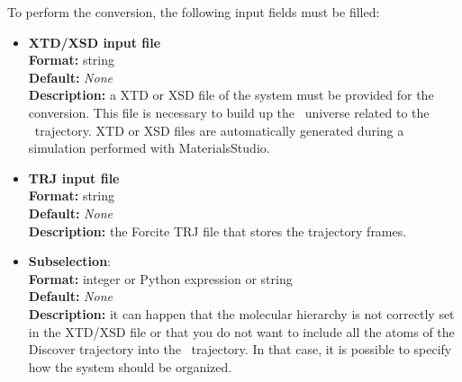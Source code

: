 \documentclass[a4paper,11pt]{report}
\begin{document}
To perform the conversion, the following input fields must be filled:
\hypertarget{forcite_converter_xtd_xsd_input_file}{}
\begin{itemize}
\item \textbf{XTD/XSD input file}\\
\textbf{Format:} string\\
\textbf{Default:} \textit{None}\\
\textbf{Description:} a XTD or XSD file of the system must be provided for the conversion. This file is necessary to build up 
the \MMTK\ universe related to the \MMTK\ trajectory. XTD or XSD files are automatically generated during a simulation performed 
with MaterialsStudio.

\hypertarget{forcite_converter_trj_input_file}{}
\item \textbf{TRJ input file}\\
\textbf{Format:} string\\
\textbf{Default:} \textit{None}\\
\textbf{Description:} the Forcite TRJ file that stores the trajectory frames.

\hypertarget{forcite_converter_subselection}{}
\item \textbf{Subselection}:\\
\textbf{Format:} integer or Python expression or string\\
\textbf{Default:} \textit{None}\\
\textbf{Description:} it can happen that the molecular hierarchy is not correctly set in the XTD/XSD file or that 
you do not want to include all the atoms of the Discover trajectory into the \MMTK\ trajectory. In that case, 
it is possible to specify how the system should be organized.


\end{itemize}
\end{document}
